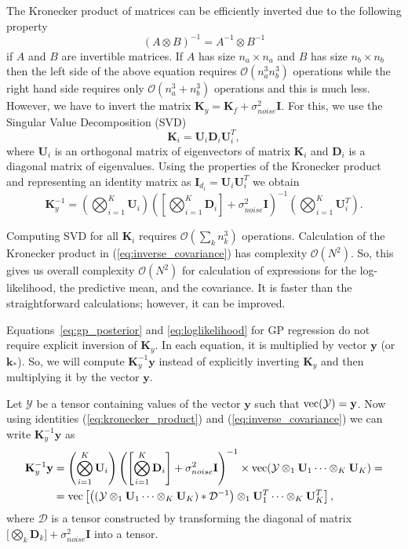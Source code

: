 The Kronecker product of matrices can be efficiently inverted due to the following
property
\[
(A \otimes B)^{-1} = A^{-1} \otimes B^{-1}
\]
if $A$ and $B$ are invertible matrices.
If $A$ has size $n_a \times n_a$ and $B$ has size $n_b \times n_b$ then
the left side of the above equation requires $\mathcal{O}(n_a^3n_b^3)$ operations
while the right hand side requires only $\mathcal{O}(n_a^3 + n_b^3)$ operations
and this is much less.
However, we have to invert the matrix $\mathbf{K}_y = \mathbf{K}_f + \sigma_{noise}^2 \mathbf{I}$.
For this, we use the Singular Value Decomposition (SVD)
\[
\mathbf{K}_i = \mathbf{U}_i \mathbf{D}_i \mathbf{U}_i^T,
\]
where $\mathbf{U}_i$ is an orthogonal matrix of eigenvectors of matrix $\mathbf{K}_i$
and $\mathbf{D}_i$ is a diagonal matrix of eigenvalues.
Using the properties of the Kronecker product and representing an identity matrix as
$\mathbf{I}_{d_i} = \mathbf{U}_i \mathbf{U}_i^T$ we obtain
\begin{equation}
  \label{eq:inverse_covariance}
  \mathbf{K}_y^{-1} = \left (\bigotimes_{i = 1}^K \mathbf{U}_i \right ) \left (
    \left [\bigotimes_{i = 1}^K \mathbf{D}_i \right ] + \sigma_{noise}^2 \mathbf{I} \right )^{-1}
  \left ( \bigotimes_{i = 1}^K \mathbf{U}_i^T \right ).
\end{equation}

Computing SVD for all $\mathbf{K}_i$ requires $\mathcal{O}(\sum_k n_k^3)$ operations.
Calculation of the Kronecker product in (\ref{eq:inverse_covariance}) has complexity $\mathcal{O}(N^2)$.
So, this gives us overall complexity $\mathcal{O}(N^2)$ for calculation of expressions for the log-likelihood,
the predictive mean, and the covariance.
It is faster than the straightforward calculations; however, it can be improved.

Equations~\eqref{eq:gp_posterior} and \eqref{eq:loglikelihood}
for GP regression do not require explicit inversion of $\mathbf{K}_y$.
In each equation, it is multiplied by vector $\mathbf{y}$ (or $\mathbf{k}_*$).
So, we will compute $\mathbf{K}_y^{-1} \mathbf{y}$ instead of explicitly inverting
$\mathbf{K}_y$ and then multiplying it by the vector $\mathbf{y}$.

Let $\mathcal{Y}$ be a tensor containing values of the vector $\mathbf{y}$ such that
${\rm vec}(\mathcal{Y}) = \mathbf{y}$.
Now using identities (\ref{eq:kronecker_product}) and (\ref{eq:inverse_covariance})
we can write $\mathbf{K}_y^{-1}\mathbf{y}$ as
\begin{align}
  \label{eq:fast_inverse_covariance}
    \mathbf{K}_y^{-1}\mathbf{y} &= \left ( \bigotimes_{i = 1}^K \mathbf{U}_i \right )
    \left ( \left [\bigotimes_{i = 1}^K \mathbf{D}_i \right ] + \sigma_{noise}^2 \mathbf{I} \right )^{-1} \times
    {\rm vec}(\mathcal{Y} \otimes_1 \mathbf{U}_1 \cdots \otimes_K \mathbf{U}_K) = \nonumber \\
    &= {\rm vec}\left [ \left ((\mathcal{Y} \otimes_1 \mathbf{U}_1 \cdots \otimes_K \mathbf{U}_K) * \mathcal{D}^{-1} \right ) \otimes_1
    \mathbf{U}_1^T \cdots \otimes_K \mathbf{U}_K^T \right ],
\end{align}
where $\mathcal{D}$ is a tensor constructed by transforming the diagonal of matrix
$\big [\bigotimes_k \mathbf{D}_k \big ] + \sigma_{noise}^2 \mathbf{I}$ into a tensor.

